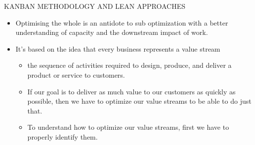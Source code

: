 \documentclass{beamer}
\begin{document}
\begin{frame}{KANBAN METHODOLOGY AND LEAN APPROACHES}
\begin{itemize}
	\item Optimising the whole is an antidote to sub 
	optimization with a better understanding of 
	capacity and the downstream impact of 
	work.
	\item It’s based on the idea that every business 
	represents a value stream 
	\begin{itemize}
		\item the sequence of activities required to design, 
		produce, and deliver a product or service to 
		customers.
		\item If our goal is to deliver as much value to our 
		customers as quickly as possible, then we have 
		to optimize our value streams to be able to do 
		just that.
		\item To understand how to optimize our value 
		streams, first we have to properly identify them.
	\end{itemize}
\end{itemize}
\end{frame}
\end{document}
